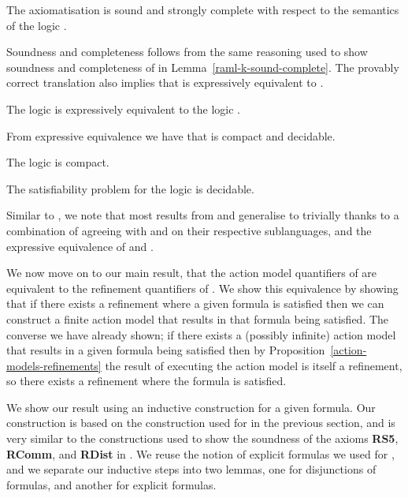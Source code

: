 \begin{lemma}\label{raml-s5-sound-complete}
The axiomatisation \axiomRamlS{} is sound and strongly complete with respect to the semantics of the logic \logicRamlS{}.
\end{lemma}

Soundness and completeness follows from the same reasoning used to show soundness and completeness of \axiomRamlK{} in Lemma~\ref{raml-k-sound-complete}.
The provably correct translation also implies that \logicRamlS{} is expressively equivalent to \logicS{}.

\begin{corollary}\label{raml-s5-expressive-equivalence}
The logic \logicRamlS{} is expressively equivalent to the logic \logicS{}.
\end{corollary}

From expressive equivalence we have that \logicRmlS{} is compact and decidable.

\begin{corollary}
The logic \logicRamlS{} is compact.
\end{corollary}

\begin{corollary}
The satisfiability problem for the logic \logicRamlS{} is decidable.
\end{corollary}

Similar to \logicRamlK{}, we note that most results from \logicAmlS{} and \logicRmlS{} generalise to \logicRamlS{} trivially thanks to a combination of \logicRamlS{} agreeing with \logicAmlS{} and \logicRmlS{} on their respective sublanguages, and the expressive equivalence of \logicRamlS{} and \logicS{}.

We now move on to our main result, that the action model quantifiers of \logicAamlS{} are equivalent to the refinement quantifiers of \logicRmlS{}.
We show this equivalence by showing that if there exists a refinement where a given formula is satisfied then we can construct a finite action model that results in that formula being satisfied.
The converse we have already shown; if there exists a (possibly infinite) action model that results in a given formula being satisfied then by Proposition~\ref{action-models-refinements} the result of executing the action model is itself a refinement, so there exists a refinement where the formula is satisfied.

We show our result using an inductive construction for a given formula.
Our construction is based on the construction used for \logicRamlK{} in the previous section, and is very similar to the constructions used to show the soundness of the axioms {\bf RS5}, {\bf RComm}, and {\bf RDist} in \logicRmlS{}.
We reuse the notion of explicit formulas we used for \logicRmlS{}, and we separate our inductive steps into two lemmas, one for disjunctions of formulas, and another for explicit formulas.

